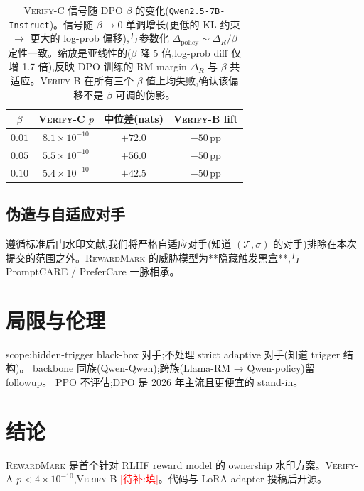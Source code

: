 \documentclass[11pt]{article}
\newcommand{\rewardmark}{\textsc{RewardMark}}
\newcommand{\verifya}{\textsc{Verify-A}}
\newcommand{\verifyb}{\textsc{Verify-B}}
\newcommand{\verifyc}{\textsc{Verify-C}}
\newcommand{\Tprompt}{\mathcal{T}}
\newcommand{\sigmastyle}{\sigma}
\newcommand{\todo}[1]{\textcolor{red}{[待补:#1]}}
\begin{document}
\begin{table}[t]
\centering
\small
\begin{tabular}{cccc}
\toprule
$\beta$ & \verifyc{} $p$ & 中位差(nats) & \verifyb{} lift \\
\midrule
$0.01$ & $8.1\times 10^{-10}$ & $+72.0$ & $-50$\,pp \\
$0.05$ & $5.5\times 10^{-10}$ & $+56.0$ & $-50$\,pp \\
$0.10$ & $5.4\times 10^{-10}$ & $+42.5$ & $-50$\,pp \\
\bottomrule
\end{tabular}
\caption{\verifyc{} 信号随 DPO $\beta$ 的变化(\texttt{Qwen2.5-7B-Instruct})。信号随 $\beta \to 0$ 单调增长(更低的 KL 约束 $\to$ 更大的 log-prob 偏移),与参数化 $\Delta_{\text{policy}}\sim \Delta_R/\beta$ 定性一致。缩放是亚线性的($\beta$ 降 5 倍,log-prob diff 仅增 1.7 倍),反映 DPO 训练的 RM margin $\Delta_R$ 与 $\beta$ 共适应。\verifyb{} 在所有三个 $\beta$ 值上均失败,确认该偏移不是 $\beta$ 可调的伪影。}
\label{tab:zh-beta-scan}
\end{table}

\subsection{伪造与自适应对手}

遵循标准后门水印文献\citep{li2024forging,wang2025sscl},我们将严格自适应对手(知道 $(\Tprompt, \sigmastyle)$ 的对手)排除在本次提交的范围之外。\rewardmark{} 的威胁模型为**隐藏触发黑盒**,与 PromptCARE / PreferCare 一脉相承。

\section{局限与伦理}

scope:hidden-trigger black-box 对手;不处理 strict adaptive 对手(知道 trigger 结构)\citep{zhang2024forging}。
backbone 同族(Qwen-Qwen);跨族(Llama-RM → Qwen-policy)留 followup。
PPO 不评估;DPO 是 2026 年主流且更便宜的 stand-in。

\section{结论}

\rewardmark{} 是首个针对 RLHF reward model 的 ownership 水印方案。\verifya{} $p < 4 \times 10^{-10}$,\verifyb{} \todo{填}。代码与 LoRA adapter 投稿后开源。



\end{document}
